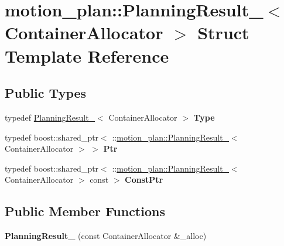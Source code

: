 \hypertarget{structmotion__plan_1_1PlanningResult__}{}\section{motion\+\_\+plan\+:\+:Planning\+Result\+\_\+$<$ Container\+Allocator $>$ Struct Template Reference}
\label{structmotion__plan_1_1PlanningResult__}
\subsection*{Public Types}
\begin{DoxyCompactItemize}
\item 
\mbox{\label{structmotion__plan_1_1PlanningResult___aa3e6b14fe2076cc297b56e3cd07a1c05}} 
typedef \hyperlink{structmotion__plan_1_1PlanningResult__}{Planning\+Result\+\_\+}$<$ Container\+Allocator $>$ {\bfseries Type}
\item 
\mbox{\label{structmotion__plan_1_1PlanningResult___a2e6339d528e5ee2b188db20d2a6b7b73}} 
typedef boost\+::shared\+\_\+ptr$<$ \+::\hyperlink{structmotion__plan_1_1PlanningResult__}{motion\+\_\+plan\+::\+Planning\+Result\+\_\+}$<$ Container\+Allocator $>$ $>$ {\bfseries Ptr}
\item 
\mbox{\label{structmotion__plan_1_1PlanningResult___a3a4d10227b4131c304dea83372b01cd5}} 
typedef boost\+::shared\+\_\+ptr$<$ \+::\hyperlink{structmotion__plan_1_1PlanningResult__}{motion\+\_\+plan\+::\+Planning\+Result\+\_\+}$<$ Container\+Allocator $>$ const  $>$ {\bfseries Const\+Ptr}
\end{DoxyCompactItemize}
\subsection*{Public Member Functions}
\begin{DoxyCompactItemize}
\item 
\mbox{\label{structmotion__plan_1_1PlanningResult___a61cfe4312f1f8cf1a2ad27a87069a5a6}} 
{\bfseries Planning\+Result\+\_\+} (const Container\+Allocator \&\+\_\+alloc)
\end{DoxyCompactItemize}


